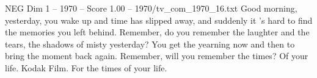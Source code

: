 \begin{textsample}{NEG Dim 1 – 1970 – Score 1.00 – 1970/tv\_com\_1970\_16.txt}  \label{ex:f1_neg_069}
Good morning, yesterday, you wake up and time has slipped away, and suddenly it 's hard to find the memories you left behind.
Remember, do you remember the laughter and the tears, the shadows of misty yesterday?
You get the yearning now and then to bring the moment back again.
Remember, will you remember the times?
Of your life.
Kodak Film.
For the times of your life.

\end{textsample}
